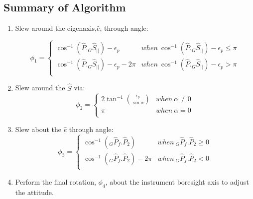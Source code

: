 \documentclass[letterpaper, preprint, paper,11pt]{AAS}	%
\begin{document}
	
	\subsection{Summary of Algorithm} 
	
	\begin{enumerate}
		\item Slew around the eigenaxis,$\hat{e}$, through angle:
		
		\begin{equation}\label{phi1}
		\phi_1=\left\{
		\begin{array}{ll}
		\cos^{-1}(\hat{P}._G\hat{S}_{||})-\epsilon_p& when\  \cos^{-1}(\hat{P}._G\hat{S}_{||})-\epsilon_p\leq \pi\\
		\cos^{-1}(\hat{P}._G\hat{S}_{||})-\epsilon_p-2\pi& when\ \cos^{-1}(\hat{P}._G\hat{S}_{||})-\epsilon_p>\pi\\
		\end{array}
		\right.
		\end{equation}
		\item Slew around the $\hat{S}$ via:
		\begin{equation}\label{phi2}
		\phi_2=\left\{
		\begin{array}{ll}
		2\tan^{-1}(\frac{\epsilon_p}{\sin\alpha})& when\  \alpha\neq 0\\
		\pi& when\ \alpha=0\\
		\end{array}
		\right.
		\end{equation}
		\item Slew about the $\hat{e}$ through angle:
		\begin{equation}\label{phi3}
		\phi_3=\left\{
		\begin{array}{ll}
		\cos^{-1}(_G\hat{P}_f.\hat{P}_2)& when\  _G\hat{P}_f.\hat{P}_2\geq 0\\
		\cos^{-1}(_G\hat{P}_f.\hat{P}_2)-2\pi& when\ _G\hat{P}_f.\hat{P}_2<0\\
		\end{array}
		\right.
		\end{equation}
		
		\item Perform the final rotation, $\phi_4$, about the instrument boresight axis to adjust the attitude. 
	\end{enumerate}
	
\end{document}
